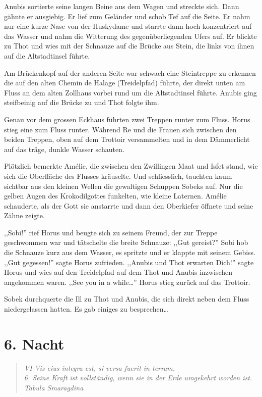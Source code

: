 Anubis sortierte seine langen Beine aus dem Wagen und streckte sich. Dann gähnte er ausgiebig. Er lief zum Geländer und schob Tef auf die Seite. Er nahm nur eine kurze Nase von der Huskydame und starrte dann hoch konzentriert auf das Wasser und nahm die Witterung des gegenüberliegenden Ufers auf. Er blickte zu Thot und wies mit der Schnauze auf die Brücke aus Stein, die links von ihnen auf die Altstadtinsel führte.

Am Brückenkopf auf der anderen Seite war schwach eine Steintreppe zu erkennen die auf den alten Chemin de Halage (Treidelpfad) führte, der direkt unten am Fluss an dem alten Zollhaus vorbei rund um die Altstadtinsel führte. Anubis ging steifbeinig auf die Brücke zu und Thot folgte ihm.

Genau vor dem grossen Eckhaus führten zwei Treppen runter zum Fluss. Horus stieg eine zum Fluss runter. Während Re und die Frauen sich zwischen den beiden Treppen, oben auf dem Trottoir versammelten und in dem Dämmerlicht auf das träge, dunkle Wasser schauten.

Plötzlich bemerkte Amélie, die zwischen den Zwillingen Maat und Isfet stand, wie sich die Oberfläche des Flusses kräuselte. Und schliesslich, tauchten kaum sichtbar aus den kleinen Wellen die gewaltigen Schuppen Sobeks auf. Nur die gelben Augen des Krokodilgottes funkelten, wie kleine Laternen. Amélie schauderte, als der Gott sie anstarrte und dann den Oberkiefer öffnete und seine Zähne zeigte.

,,Sobi!'' rief Horus und beugte sich zu seinem Freund, der zur Treppe geschwommen war und tätschelte die breite Schnauze: ,,Gut gereist?'' Sobi hob die Schnauze kurz aus dem Wasser, es spritzte und er klappte mit seinem Gebiss. ,,Gut gegessen!'' sagte Horus zufrieden. ,,Anubis und Thot erwarten Dich!'' sagte Horus und wies auf den Treidelpfad auf dem Thot und Anubis inzwischen angekommen waren. ,,See you in a while\dots '' Horus stieg zurück auf das Trottoir.

Sobek durchquerte die Ill zu Thot und Anubis, die sich direkt neben dem Fluss niedergelassen hatten. Es gab einiges zu besprechen\dots

\chapter*{6. Nacht}

\begin{quotation}

\emph{VI Vis eius integra est, si versa fuerit in terram.\\6. Seine Kraft ist vollständig, wenn sie in der Erde umgekehrt worden ist.  \\Tabula Smaragdina}

\end{quotation}

